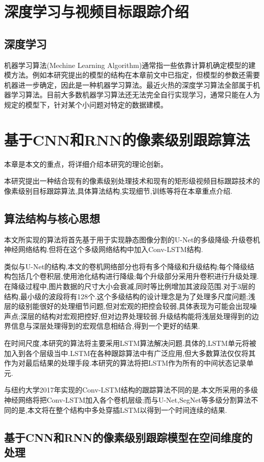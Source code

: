 \chapter{深度学习与视频目标跟踪介绍}
\section{深度学习}
机器学习算法(Mechine Learning Algorithm)通常指一些依靠计算机确定模型的建模方法。例如本研究提出的模型的结构在本章前文中已指定，但模型的参数还需要机器进一步确定，因此是一种机器学习算法。最近火热的深度学习算法全部属于机器学习算法。目前大多数机器学习算法还无法完全自行实现学习，通常只能在人为规定的模型下，针对某个小问题对特定的数据建模。

\chapter{基于CNN和RNN的像素级别跟踪算法}
本章是本文的重点，将详细介绍本研究的理论创新。
\par
本研究提出一种结合现有的像素级别处理技术和现有的矩形级视频目标跟踪技术的像素级别目标跟踪算法,具体算法结构,实现细节,训练等将在本章重点介绍.
\section{算法结构与核心思想}
本文所实现的算法将首先基于用于实现静态图像分割的U-Net\supercite{ronneberger2015u}的多级降级-升级卷机神经网络结构.但将在这个多级网络结构中加入Conv-LSTM结构.
\par
类似与U-Net的结构,本文的卷机网络部分也将有多个降级和升级结构;每个降级结构包括几个卷积层,使用池化结构进行降级;每个升级部分采用升卷积进行升级处理.在降级过程中,图片数据的尺寸大小会衰减,同时等比例增加其波段范围.对于3层的结构,最小级的波段将有128个.这个多级结构的设计理念是为了处理多尺度问题;浅层的级别能很好的处理细节问题,但对宏观的把控会较弱,具体表现为可能会出现噪声点;深层的结构对宏观把控好,但对边界处理较弱.升级结构能将浅层处理得到的边界信息与深层处理得到的宏观信息相结合,得到一个更好的结果.
\par
在时间尺度,本研究的算法将主要采用LSTM算法解决问题.具体的,LSTM单元将被加入到各个层级当中.LSTM在各种跟踪算法中有广泛应用,但大多数算法仅仅将其作为对最后结果的处理手段.本研究的算法将把LSTM作为所有的中间状态记录单元.
\par
与纽约大学2017年实现的Conv-LSTM结构的跟踪算法不同的是,本文所采用的多级神经网络将把Conv-LSTM加入各个卷机层级;而与U-Net,SegNet等多级分割算法不同的是,本文将在整个结构中多处穿插LSTM以得到一个时间连续的结果.
\section{基于CNN和RNN的像素级别跟踪模型在空间维度的处理}
